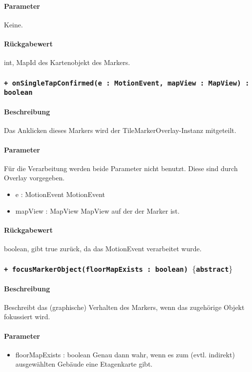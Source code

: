 \paragraph*{Parameter}
Keine.
\paragraph*{Rückgabewert}
int, MapId des Kartenobjekt des Markers.

\subsubsection{\texttt{+ onSingleTapConfirmed(e : MotionEvent, mapView : MapView) : boolean}}%
\paragraph*{Beschreibung}
Das Anklicken dieses Markers wird der TileMarkerOverlay-Instanz mitgeteilt.
\paragraph*{Parameter}
Für die Verarbeitung werden beide Parameter nicht benutzt. Diese sind durch Overlay vorgegeben.
\begin{itemize}
    \item e : MotionEvent MotionEvent
    \item mapView : MapView MapView auf der der Marker ist.
\end{itemize}
\paragraph*{Rückgabewert}
boolean, gibt true zurück, da das MotionEvent verarbeitet wurde.

\subsubsection{\texttt{+ focusMarkerObject(floorMapExists : boolean) $\lbrace$abstract$\rbrace$}}%
\paragraph*{Beschreibung}
Beschreibt das (graphische) Verhalten des Markers, wenn das zugehörige Objekt fokussiert wird.
\paragraph*{Parameter}
\begin{itemize}
    \item floorMapExists : boolean Genau dann wahr, wenn es zum (evtl. indirekt) ausgewählten Gebäude eine Etagenkarte gibt.
\end{itemize}
